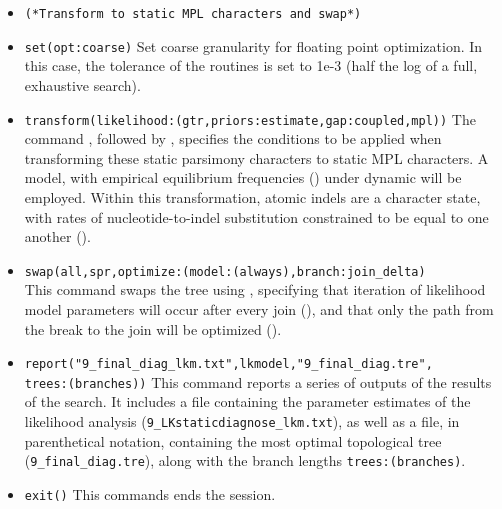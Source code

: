 \begin{itemize}
\item \texttt{(*Transform to static MPL characters and swap*)}
\item \texttt{set(opt:coarse)} Set coarse granularity for floating point optimization. In this case, 
the tolerance of the routines is set to 1e-3 (half the log of a full, exhaustive search).
\item \texttt{transform(likelihood:(gtr,priors:estimate,gap:coupled,mpl))} The command 
, followed by , specifies the conditions 
to be applied when transforming these static parsimony characters to static MPL characters. 
A  model, with empirical equilibrium frequencies () 
under dynamic  will be employed. Within this transformation, atomic indels 
are a character state, with rates of nucleotide-to-indel substitution constrained to be equal to one another 
(). 
\item \texttt{swap(all,spr,optimize:(model:(always),branch:join\_delta)} \\ This command swaps the tree using 
, specifying that iteration of likelihood model parameters will occur after every 
join (), and that only the path from the break to the join will be optimized 
().
\item \texttt{report("9\_final\_diag\_lkm.txt",lkmodel,"9\_final\_diag.tre",\\ trees:(branches))} This command 
reports a series of outputs of the results of the search.  It includes a file containing the parameter
estimates of the likelihood analysis (\texttt{9\_LKstaticdiagnose\_lkm.txt}), as well as a file, 
in parenthetical notation, containing the most optimal topological tree (\texttt{9\_final\_diag.tre}), 
along with the branch lengths \texttt{trees:(branches)}.
\item \texttt{exit()} This commands ends the \poy session.
\end{itemize}

